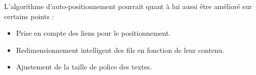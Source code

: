 L'algorithme d'auto-positionnement pourrait quant à lui aussi être amélioré sur certains points :
\begin{itemize}
	\item Prise en compte des liens pour le positionnement.
	\item Redimensionnement intelligent des fils en fonction de leur contenu.
	\item Ajustement de la taille de police des textes.
\end{itemize}
